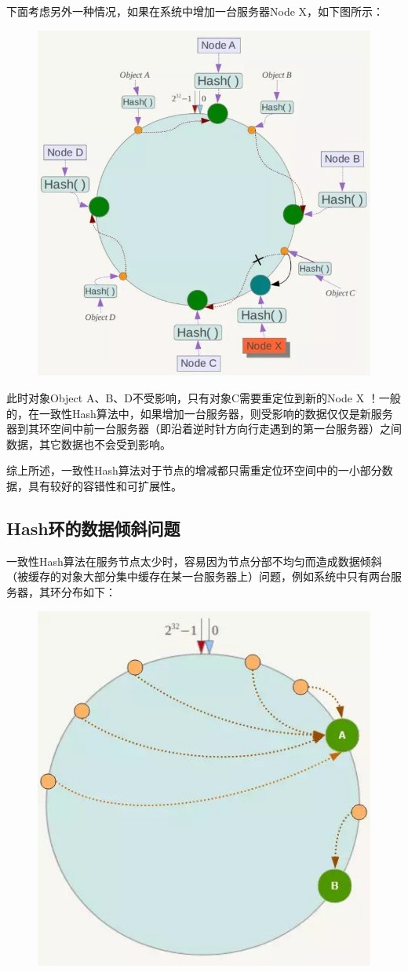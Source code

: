 \documentclass[12pt]{article}
\begin{document}
下面考虑另外一种情况，如果在系统中增加一台服务器Node X，如下图所示：
\begin{figure}[H]
    \centering
    \includegraphics[width=.5\textwidth]{fig/Consistent_Hashing_9.jpg}
\end{figure}

此时对象Object A、B、D不受影响，只有对象C需要重定位到新的Node X ！一般的，在一致性Hash算法中，如果增加一台服务器，则受影响的数据仅仅是新服务器到其环空间中前一台服务器（即沿着逆时针方向行走遇到的第一台服务器）之间数据，其它数据也不会受到影响。

综上所述，一致性Hash算法对于节点的增减都只需重定位环空间中的一小部分数据，具有较好的容错性和可扩展性。

\subsection{Hash环的数据倾斜问题}
一致性Hash算法在服务节点太少时，容易因为节点分部不均匀而造成数据倾斜（被缓存的对象大部分集中缓存在某一台服务器上）问题，例如系统中只有两台服务器，其环分布如下：
\begin{figure}[H]
    \centering
    \includegraphics[width=.5\textwidth]{fig/Consistent_Hashing_10.jpg}
\end{figure}
\end{document}
